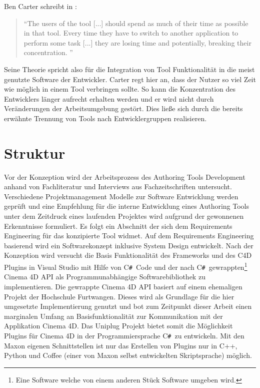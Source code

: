 \documentclass[pagesize, paper=a4, fontsize=12pt, titlepage=true, headings=small, headnosepline, abstractoff, liststotoc, nochapterprefix, plainheadsepline, twoside]{scrreprt}
\newcommand{\CSS}{C\texttt{\# }}
\begin{document}
Ben Carter schreibt in :
\begin{quote}
“The users of the tool [...] should spend as much of their time as possible in that tool. Every time they have to switch to another application to perform some task [...] they are losing time and potentially, breaking their concentration. \cite[S. 18]{Carter2004}”
\end{quote}
Seine Theorie spricht also für die Integration von Tool Funktionalität in die meist genutzte Software der Entwickler. Carter regt hier an, dass der Nutzer so viel Zeit wie möglich in einem Tool verbringen sollte. So kann die Konzentration des Entwicklers länger aufrecht erhalten werden und er wird nicht durch Veränderungen der Arbeitsumgebung gestört. Dies ließe sich durch die bereits erwähnte Trennung von Tools nach Entwicklergruppen realisieren.

\section{Struktur}
Vor der Konzeption wird der Arbeitsprozess des Authoring Tools Development anhand von Fachliteratur und Interviews aus Fachzeitschriften untersucht. Verschiedene Projektmanagement Modelle zur Software Entwicklung werden geprüft und eine Empfehlung für die interne Entwicklung eines Authoring Tools unter dem Zeitdruck eines laufenden Projektes wird aufgrund der gewonnenen Erkenntnisse formuliert. Es folgt ein Abschnitt der sich dem Requirements Engineering für das konzipierte Tool widmet. Auf dem Requirements Engineering basierend wird ein Softwarekonzept inklusive System Design entwickelt. Nach der Konzeption wird versucht die Basis Funktionalität des Frameworks und des C4D Plugins in Visual Studio mit Hilfe von \CSS Code und der nach \CSS gewrappten\footnote{Eine Software welche von einem anderen Stück Software umgeben wird.} Cinema 4D API als Programmunabhängige Softwarebibliothek zu implementieren. Die gewrappte Cinema 4D API basiert auf einem ehemaligen Projekt der Hochschule Furtwangen. Dieses wird als Grundlage für die hier umgesetzte Implementierung genutzt und bot zum Zeitpunkt dieser Arbeit einen marginalen Umfang an Basisfunktionalität zur Kommunikation mit der Applikation Cinema 4D. Das Uniplug Projekt bietet somit die Möglichkeit Plugins für Cinema 4D in der Programmiersprache \CSS zu entwickeln. Mit den Maxon eigenen Schnittstellen ist nur das Erstellen von Plugins nur in C++, Python und Coffee (einer von Maxon selbst entwickelten Skriptsprache) möglich.
\end{document}
